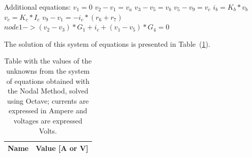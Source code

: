 Additional equations:
$v_1= 0$
$v_2 - v_1 = v_a$
$v_3 - v_5 = v_b$
$v_5 - v_9 = v_c$
$i_b = K_b*v_b$
$v_c = K_c*I_c$
$v_9 - v_1 = -i_c*(r_6 + r_7)$
$node 1 -> (v_2 - v_3)*G_1 + i_c +(v_1 - v_5)*G_4 = 0$

The solution of this system of equations is presented in Table~(\ref{tab:nodal}). 

\begin{table}[h]
  \centering
  \begin{tabular}{|l|r|}
    \hline    
    {\bf Name} & {\bf Value [A or V]} \\ \hline
    
  \end{tabular}
  \caption{Table with the values of the unknowns from the system of equations obtained with the Nodal Method, solved using Octave; currents are expressed in Ampere and voltages are expressed Volts.}
  \label{tab:nodal}
\end{table}




